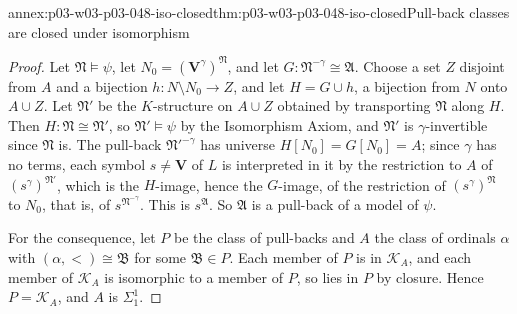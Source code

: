 \begin{annexitem}{annex:p03-w03-p03-048-iso-closed}{thm:p03-w03-p03-048-iso-closed}{Pull-back classes are closed under isomorphism}
\begin{proof}
Let \(\mathfrak N\models\psi\), let \(N_0=(\mathbf V^{\gamma})^{\mathfrak N}\),
and let \(G:\mathfrak N^{-\gamma}\cong\mathfrak A\).  Choose a set \(Z\)
disjoint from \(A\) and a bijection \(h:N\setminus N_0\to Z\), and let
\(H=G\cup h\), a bijection from \(N\) onto \(A\cup Z\).  Let \(\mathfrak N'\)
be the \(K\)-structure on \(A\cup Z\) obtained by transporting \(\mathfrak N\)
along \(H\).  Then \(H:\mathfrak N\cong\mathfrak N'\), so
\(\mathfrak N'\models\psi\) by the Isomorphism Axiom, and \(\mathfrak N'\) is
\(\gamma\)-invertible since \(\mathfrak N\) is.  The pull-back
\(\mathfrak N'^{-\gamma}\) has universe \(H[N_0]=G[N_0]=A\); since \(\gamma\)
has no terms, each symbol \(s\neq\mathbf V\) of \(L\) is interpreted in it by
the restriction to \(A\) of \((s^{\gamma})^{\mathfrak N'}\), which is the
\(H\)-image, hence the \(G\)-image, of the restriction of
\((s^{\gamma})^{\mathfrak N}\) to \(N_0\), that is, of \(s^{\mathfrak
N^{-\gamma}}\).  This is \(s^{\mathfrak A}\).  So \(\mathfrak A\) is a
pull-back of a model of \(\psi\).

For the consequence, let \(P\) be the class of pull-backs and \(A\) the class
of ordinals \(\alpha\) with \((\alpha,<)\cong\mathfrak B\) for some
\(\mathfrak B\in P\).  Each member of \(P\) is in \(\mathcal K_A\), and each
member of \(\mathcal K_A\) is isomorphic to a member of \(P\), so lies in
\(P\) by closure.  Hence \(P=\mathcal K_A\), and \(A\) is \(\Sigma^1_1\).
\end{proof}
\end{annexitem}

